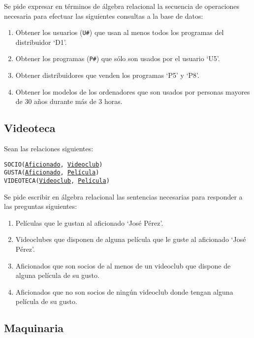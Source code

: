 \documentclass{db-practice}
\begin{document}
Se pide expresar en términos de álgebra relacional la secuencia de operaciones necesaria para efectuar las siguientes consultas a la base de datos:

\begin{enumerate}
    \item Obtener los usuarios (\texttt{U\#}) que usan al menos todos los programas del distribuidor `D1'.
    \item Obtener los programas (\texttt{P\#}) que sólo son usados por el usuario `U5'.
    \item Obtener distribuidores que venden los programas `P5' y `P8'.
    \item Obtener los modelos de los ordenadores que son usados por personas mayores de 30 años durante más de 3 horas.
\end{enumerate}

\subsection{Videoteca}

Sean las relaciones siguientes:

\begin{addmargin}[1.5em]{0em}
    \texttt{SOCIO(\underline{Aficionado}, \underline{Videoclub})}\\
    \texttt{GUSTA(\underline{Aficionado}, \underline{Película})}\\
    \texttt{VIDEOTECA(\underline{Videoclub}, \underline{Película})}
\end{addmargin}

Se pide escribir en álgebra relacional las sentencias necesarias para responder a las preguntas siguientes:

\begin{enumerate}
    \item Películas que le gustan al aficionado `José Pérez'.
    \item Videoclubes que disponen de alguna película que le guste al aficionado `José Pérez'.
    \item Aficionados que son socios de al menos de un videoclub que dispone de alguna película de su gusto.
    \item Aficionados que no son socios de ningún videoclub donde tengan alguna película de su gusto.
\end{enumerate}

\subsection{Maquinaria}
\end{document}
